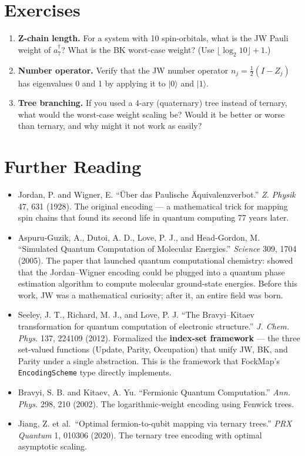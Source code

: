 \documentclass[
  11pt,
  oneside]{book}
\providecommand{\tightlist}{%
  \setlength{\itemsep}{0pt}\setlength{\parskip}{0pt}}
\begin{document}
\section{Exercises}\label{exercises-4}

\begin{enumerate}
\def\labelenumi{\arabic{enumi}.}
\item
  \textbf{Z-chain length.} For a system with 10 spin-orbitals, what is
  the JW Pauli weight of \(a_7^\dagger\)? What is the BK worst-case
  weight? (Use \(\lfloor \log_2 10 \rfloor + 1\).)
\item
  \textbf{Number operator.} Verify that the JW number operator
  \(n_j = \frac{1}{2}(I - Z_j)\) has eigenvalues 0 and 1 by applying it
  to \(\lvert 0 \rangle\) and \(\lvert 1 \rangle\).
\item
  \textbf{Tree branching.} If you used a 4-ary (quaternary) tree instead
  of ternary, what would the worst-case weight scaling be? Would it be
  better or worse than ternary, and why might it not work as easily?
\end{enumerate}

\section{Further Reading}\label{further-reading-4}

\begin{itemize}
\tightlist
\item
  Jordan, P. and Wigner, E. ``Über das Paulische Äquivalenzverbot.''
  \emph{Z. Physik} 47, 631 (1928). The original encoding --- a
  mathematical trick for mapping spin chains that found its second life
  in quantum computing 77 years later.
\item
  Aspuru-Guzik, A., Dutoi, A. D., Love, P. J., and Head-Gordon, M.
  ``Simulated Quantum Computation of Molecular Energies.''
  \emph{Science} 309, 1704 (2005). The paper that launched quantum
  computational chemistry: showed that the Jordan--Wigner encoding could
  be plugged into a quantum phase estimation algorithm to compute
  molecular ground-state energies. Before this work, JW was a
  mathematical curiosity; after it, an entire field was born.
\item
  Seeley, J. T., Richard, M. J., and Love, P. J. ``The Bravyi--Kitaev
  transformation for quantum computation of electronic structure.''
  \emph{J. Chem. Phys.} 137, 224109 (2012). Formalized the
  \textbf{index-set framework} --- the three set-valued functions
  (Update, Parity, Occupation) that unify JW, BK, and Parity under a
  single abstraction. This is the framework that FockMap's
  \texttt{EncodingScheme} type directly implements.
\item
  Bravyi, S. B. and Kitaev, A. Yu. ``Fermionic Quantum Computation.''
  \emph{Ann. Phys.} 298, 210 (2002). The logarithmic-weight encoding
  using Fenwick trees.
\item
  Jiang, Z. et al.~``Optimal fermion-to-qubit mapping via ternary
  trees.'' \emph{PRX Quantum} 1, 010306 (2020). The ternary tree
  encoding with optimal asymptotic scaling.
\end{itemize}
\end{document}
